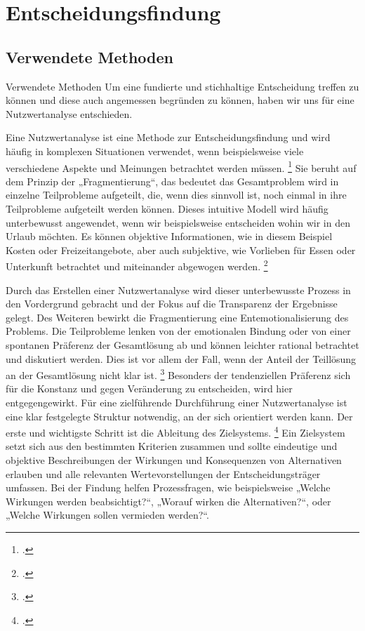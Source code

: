 \chapter{Entscheidungsfindung} %
\label{cha:Entscheidungsfindung}

\section{Verwendete Methoden} %
\label{sec:Verwendete Methoden}

Verwendete Methoden
Um eine fundierte und stichhaltige Entscheidung treffen zu können und diese auch angemessen begründen zu können, haben wir uns für eine Nutzwertanalyse entschieden.

Eine Nutzwertanalyse ist eine Methode zur Entscheidungsfindung und wird häufig in komplexen Situationen verwendet, wenn beispielsweise viele verschiedene Aspekte und Meinungen betrachtet werden müssen. \footcite[Vgl.][S. 1 auch im Folgenden]{Kuhnapfel.2019} Sie beruht auf dem Prinzip der „Fragmentierung“, das bedeutet das Gesamtproblem wird in einzelne Teilprobleme aufgeteilt, die, wenn dies sinnvoll ist, noch einmal in ihre Teilprobleme aufgeteilt werden können. Dieses intuitive Modell wird häufig unterbewusst angewendet, wenn wir beispielsweise entscheiden wohin wir in den Urlaub möchten. Es können objektive Informationen, wie in diesem Beispiel Kosten oder Freizeitangebote, aber auch subjektive, wie Vorlieben für Essen oder Unterkunft betrachtet und miteinander abgewogen werden. \footcite[Vgl.][S. 43]{Dittmer.1995}

Durch das Erstellen einer Nutzwertanalyse wird dieser unterbewusste Prozess in den Vordergrund gebracht und der Fokus auf die Transparenz der Ergebnisse gelegt. Des Weiteren bewirkt die Fragmentierung eine Entemotionalisierung des Problems. Die Teilprobleme lenken von der emotionalen Bindung oder von einer spontanen Präferenz der Gesamtlösung ab und können leichter rational betrachtet und diskutiert werden. Dies ist vor allem der Fall, wenn der Anteil der Teillösung an der Gesamtlösung nicht klar ist. \footcite[Vgl.][S. 2]{Kuhnapfel.2019} Besonders der tendenziellen Präferenz sich für die Konstanz und gegen Veränderung zu entscheiden, wird hier entgegengewirkt.
Für eine zielführende Durchführung einer Nutzwertanalyse ist eine klar festgelegte Struktur notwendig, an der sich orientiert werden kann. Der erste und wichtigste Schritt ist die Ableitung des Zielsystems. \footcite[Vgl.][S. 44 f. auch im Folgenden]{Dittmer.1995} Ein Zielsystem setzt sich aus den bestimmten Kriterien zusammen und sollte eindeutige und objektive Beschreibungen der Wirkungen und Konsequenzen von Alternativen erlauben und alle relevanten Wertevorstellungen der Entscheidungsträger umfassen. Bei der Findung helfen Prozessfragen, wie beispielsweise „Welche Wirkungen werden beabsichtigt?“, „Worauf wirken die Alternativen?“, oder „Welche Wirkungen sollen vermieden werden?“.

